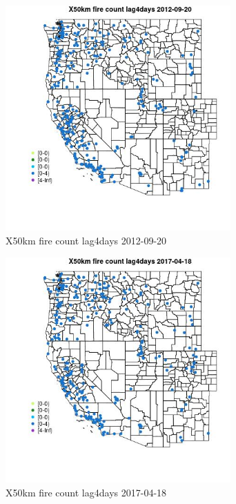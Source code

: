 \begin{figure} 
\centering  
\includegraphics[width=0.77\textwidth]{Code_Outputs/Report_ML_input_PM25_Step4_part_e_de_duplicated_aves_compiled_2019-05-14wNAs_MapObsX50km_fire_count_lag4days2012-09-20.jpg} 
\caption{\label{fig:Report_ML_input_PM25_Step4_part_e_de_duplicated_aves_compiled_2019-05-14wNAsMapObsX50km_fire_count_lag4days2012-09-20}X50km fire count lag4days 2012-09-20} 
\end{figure} 
 

\begin{figure} 
\centering  
\includegraphics[width=0.77\textwidth]{Code_Outputs/Report_ML_input_PM25_Step4_part_e_de_duplicated_aves_compiled_2019-05-14wNAs_MapObsX50km_fire_count_lag4days2017-04-18.jpg} 
\caption{\label{fig:Report_ML_input_PM25_Step4_part_e_de_duplicated_aves_compiled_2019-05-14wNAsMapObsX50km_fire_count_lag4days2017-04-18}X50km fire count lag4days 2017-04-18} 
\end{figure} 
 

